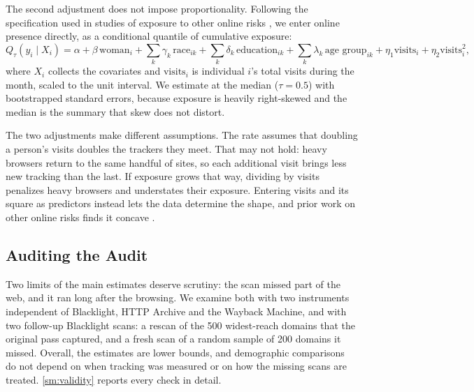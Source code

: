 \documentclass[12pt, letterpaper]{article}
\begin{document}
The second adjustment does not impose proportionality.
Following the specification used in studies of exposure to other online risks \citep{bad_domains}, we enter online presence directly, as a conditional quantile of cumulative exposure:
\begin{equation}\label{eq:demo-presence}
     Q_{\tau}(y_i \mid X_i) =
     \alpha
     + \beta\, \text{woman}_i
     + \sum_{k} \gamma_k\, \text{race}_{ik}
     + \sum_{k} \delta_k\, \text{education}_{ik}
     + \sum_{k} \lambda_k\, \text{age group}_{ik}
     + \eta_1 \text{visits}_i
     + \eta_2 \text{visits}_i^2 ,
\end{equation}
where $X_i$ collects the covariates and $\text{visits}_i$ is individual $i$'s total visits during the month, scaled to the unit interval.
We estimate at the median ($\tau = 0.5$) with bootstrapped standard errors, because exposure is heavily right-skewed and the median is the summary that skew does not distort.
 
The two adjustments make different assumptions. The rate assumes that doubling a person's visits doubles the trackers they meet. That may not hold: heavy browsers return to the same handful of sites, so each additional visit brings less new tracking than the last. If exposure grows that way, dividing by visits penalizes heavy browsers and understates their exposure. Entering visits and its square as predictors instead lets the data determine the shape, and prior work on other online risks finds it concave \citep{bad_domains}.

\subsection{Auditing the Audit}
\label{sec:audit_audit}
Two limits of the main estimates deserve scrutiny: the scan missed part of the web, and it ran long after the browsing. We examine both with two instruments independent of Blacklight, HTTP Archive and the Wayback Machine, and with two follow-up Blacklight scans: a rescan of the 500 widest-reach domains that the original pass captured, and a fresh scan of a random sample of 200 domains it missed. Overall, the estimates are lower bounds, and demographic comparisons do not depend on when tracking was measured or on how the missing scans are treated. \cref{sm:validity} reports every check in detail.
\end{document}
